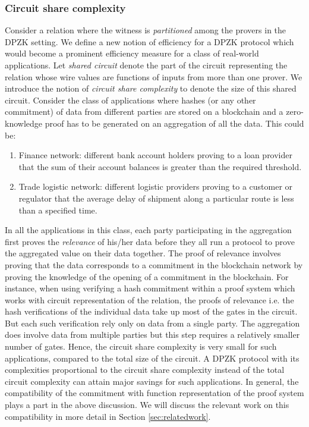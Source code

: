 \subsubsection{Circuit share complexity}
Consider a relation where the witness is \textit{partitioned} among the provers in the DPZK setting. We define a new notion of efficiency for a DPZK protocol which would become a prominent efficiency measure for a class of real-world applications.
Let \textit{shared circuit} denote the part of the circuit representing the relation whose wire values are functions of inputs from more than one prover. 
We introduce the notion of \textit{circuit share complexity} to denote the size of this shared circuit.
Consider the class of applications where hashes (or any other commitment) of data from different parties are stored on a blockchain and a zero-knowledge proof has to be generated on an aggregation of all the data. This could be: 
\begin{enumerate}
\item Finance network: different bank account holders proving to a loan provider that the sum of their account balances is greater than the required threshold.
\item Trade logistic network: different logistic providers proving to a customer or regulator that the average delay of shipment along a particular route is less than a specified time.
\end{enumerate}
In all the applications in this class, each party participating in the aggregation first proves the \textit{relevance} of his/her data before they all run a protocol to prove the aggregated value on their data together. The proof of relevance involves proving that the data corresponds to a commitment in the blockchain network by proving the knowledge of the opening of a commitment in the blockchain. 
For instance, when using verifying a hash commitment within a proof system which works with circuit representation of the relation, the proofs of relevance i.e. the hash verifications of the individual data take up most of the gates in the circuit. But each such verification rely only on data from a single party. The aggregation does involve data from multiple parties but this step requires a relatively smaller number of gates. Hence, the circuit share complexity is very small for such applications, compared to the total size of the circuit. A DPZK protocol with its complexities proportional to the circuit share complexity instead of the total circuit complexity can attain major savings for such applications.
In general, the compatibility of the commitment with function representation of the proof system plays a part in the above discussion. We will discuss the relevant work on this compatibility in more detail in Section \ref{sec:relatedwork}.

